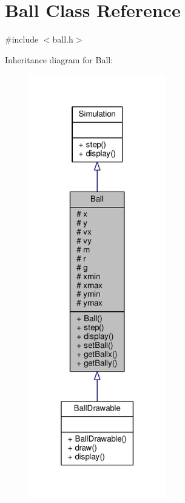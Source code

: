 \hypertarget{classBall}{}\section{Ball Class Reference}
\label{classBall}


{\ttfamily \#include $<$ball.\+h$>$}



Inheritance diagram for Ball\+:
\nopagebreak
\begin{figure}[H]
\begin{center}
\leavevmode
\includegraphics[width=169pt]{classBall__inherit__graph}
\end{center}
\end{figure}



